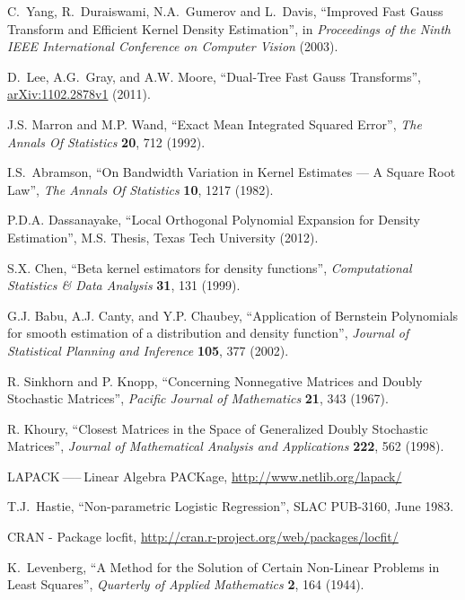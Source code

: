 \documentclass[12pt,titlepage]{article}
\begin{document}
\begin{thebibliography}{99}
 C.~Yang, R.~Duraiswami, N.A.~Gumerov and L.~Davis,
``Improved Fast Gauss Transform and Efficient Kernel Density Estimation'',
in {\it Proceedings of the Ninth IEEE International
Conference on Computer Vision} (2003).

 D.~Lee, A.G.~Gray, and A.W. Moore,
``Dual-Tree Fast Gauss Transforms'', 
\href{http://arxiv.org/abs/1102.2878}{arXiv:1102.2878v1} (2011).

 J.S. Marron and M.P. Wand, 
``Exact Mean Integrated Squared Error'', {\it The Annals Of Statistics}
{\bf 20}, 712 (1992).

 I.S.~Abramson, ``On Bandwidth Variation in Kernel
Estimates --- A Square Root Law'', {\it The Annals Of Statistics}
{\bf 10}, 1217 (1982).

 P.D.A. Dassanayake,
``Local Orthogonal Polynomial Expansion for Density Estimation'',
M.S. Thesis, Texas Tech University (2012).

 S.X. Chen, ``Beta kernel estimators for
density functions'', {\it Computational Statistics \& Data Analysis}
{\bf 31}, 131 (1999).

 G.J. Babu, A.J. Canty, and Y.P. Chaubey,
``Application of Bernstein Polynomials for smooth estimation
of a distribution and density function'', {\it Journal of Statistical
Planning and Inference} {\bf 105}, 377 (2002).

 R. Sinkhorn and P. Knopp, 
``Concerning Nonnegative Matrices and Doubly Stochastic Matrices'',
{\it Pacific Journal of Mathematics} {\bf 21}, 343 (1967).

 R. Khoury, ``Closest Matrices in the Space of
Generalized Doubly Stochastic Matrices'', {\it Journal of
Mathematical Analysis and Applications} {\bf 222}, 562 (1998).

LAPACK —-- Linear Algebra PACKage,
\href{http://www.netlib.org/lapack/}{http://www.netlib.org/lapack/}

 T.J.~Hastie, ``Non-parametric Logistic Regression'',
SLAC PUB-3160, June 1983.

CRAN - Package locfit, 
\href{http://cran.r-project.org/web/packages/locfit/}
{http://cran.r-project.org/web/packages/locfit/}

 K.~Levenberg, ``A Method for the Solution 
of Certain Non-Linear Problems in Least Squares'',
{\it Quarterly of Applied Mathematics} {\bf 2}, 164 (1944).


\end{thebibliography}
\end{document}
